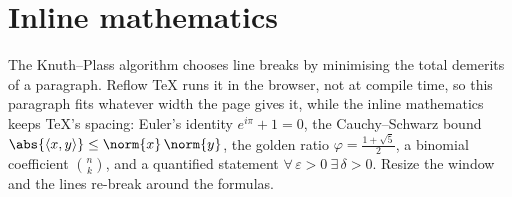 \section*{Inline mathematics}
The Knuth--Plass algorithm chooses line breaks by minimising the total
demerits of a paragraph. Reflow TeX runs it in the browser, not at compile time,
so this paragraph fits whatever width the page gives it, while the inline
mathematics keeps \TeX's spacing: Euler's identity
$e^{i\pi} + 1 = 0$, the Cauchy--Schwarz bound
$\abs{\langle x, y\rangle} \le \norm{x}\,\norm{y}$, the golden ratio
$\varphi = \tfrac{1+\sqrt{5}}{2}$, a binomial coefficient $\binom{n}{k}$, and a
quantified statement $\forall\,\varepsilon > 0\ \exists\,\delta > 0$. Resize
the window and the lines re-break around the formulas.
